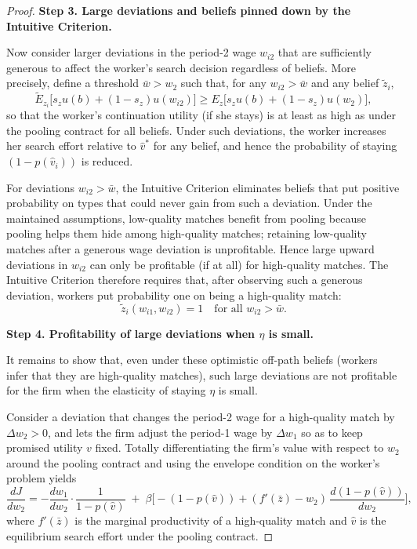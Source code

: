 \begin{proof}
\medskip
\noindent\textbf{Step 3. Large deviations and beliefs pinned down by the Intuitive Criterion.}

Now consider larger deviations in the period-2 wage $w_{i2}$ that are sufficiently generous to affect the worker's search decision regardless of beliefs. More precisely, define a threshold $\bar{w} > w_2$ such that, for any $w_{i2} > \bar{w}$ and any belief $\tilde{z}_i$,
\[
\tilde{E}_{z_i} \big[ s_{z} u(b) + (1-s_{z}) u(w_{i2}) \big]
\geq
E_{z} \big[ s_{z} u(b) + (1-s_{z}) u(w_2) \big],
\]
so that the worker’s continuation utility (if she stays) is at least as high as under the pooling contract for all beliefs. Under such deviations, the worker increases her search effort relative to $\hat{v}^\ast$ for any belief, and hence the probability of staying $(1-p(\hat{v}_i))$ is reduced.

For deviations $w_{i2} > \bar{w}$, the Intuitive Criterion eliminates beliefs that put positive probability on types that could never gain from such a deviation. Under the maintained assumptions, low-quality matches benefit from pooling because pooling helps them hide among high-quality matches; retaining low-quality matches after a generous wage deviation is unprofitable. Hence large upward deviations in $w_{i2}$ can only be profitable (if at all) for high-quality matches. The Intuitive Criterion therefore requires that, after observing such a generous deviation, workers put probability one on being a high-quality match:
\[
\tilde{z}_i(w_{i1},w_{i2}) = 1 \quad \text{for all } w_{i2} > \bar{w}.
\]

\medskip
\noindent\textbf{Step 4. Profitability of large deviations when $\eta$ is small.}

It remains to show that, even under these optimistic off-path beliefs (workers infer that they are high-quality matches), such large deviations are not profitable for the firm when the elasticity of staying $\eta$ is small.

Consider a deviation that changes the period-2 wage for a high-quality match by $\Delta w_{2} > 0$, and lets the firm adjust the period-1 wage by $\Delta w_{1}$ so as to keep promised utility $v$ fixed. Totally differentiating the firm’s value with respect to $w_2$ around the pooling contract and using the envelope condition on the worker’s problem yields
\[
\frac{d J}{d w_2}
=
- \frac{d w_1}{d w_2} \cdot \frac{1}{1-p(\hat{v})}
\;+\;
\beta \Big[
- (1-p(\hat{v})) 
+ (f'(\bar{z}) - w_2)\, \frac{d(1-p(\hat{v}))}{d w_2}
\Big],
\]
where $f'(\bar{z})$ is the marginal productivity of a high-quality match and $\hat{v}$ is the equilibrium search effort under the pooling contract.


\end{proof}
